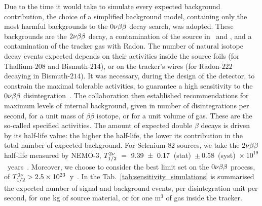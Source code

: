 Due to the time it would take to simulate every expected background contribution, the choice of a simplified background model, containing only the most harmful backgrounds to the $0\nu\beta\beta$ decay search, was adopted.
These backgrounds are the $2\nu\beta\beta$ decay, a contamination of the source in \Tl\ and \Bi, and a contamination of the tracker gas with Radon.
The number of natural isotope decay events expected depends on their activities inside the source foils (for Thallium-$208$ and Bismuth-$214$), or on the tracker's wires (for Radon-$222$ decaying in Bismuth-$214$).
It was necessary, during the design of the detector, to constrain the maximal tolerable activities, to guarantee a high sensitivity to the $0\nu\beta\beta$ disintegration~\cite{internal:SNphysicsCase}.
The collaboration then established recommendations for maximum levels of internal background, given in number of disintegrations per second, for a unit mass of $\beta\beta$ isotope, or for a unit volume of gas.
These are the so-called specified activities.
The amount of expected double $\beta$ decays is driven by its half-life value: the higher the half-life, the lower its contribution in the total number of expected background.
For Selenium-$82$ sources, we take the $2\nu\beta\beta$ half-life measured by NEMO-$3$, $T_{1/2}^{2\nu}~=~9.39~\pm~0.17$~(stat)~$\pm~0.58$~(syst)~$\times~10^{19}$~years~\cite{art:NEMO2018}.
Moreover, we choose to consider the best limit set on the $0\nu\beta\beta$ process, of $T_{1/2}^{0\nu} > 2.5\times 10^{23}$~y~\cite{art:NEMO2018}.
In the Tab.~\ref{tab:sensitivity_simulations} is summarised the expected number of signal and background events, per disintegration unit per second, for one kg of source material, or for one m$^{3}$ of gas inside the tracker.
